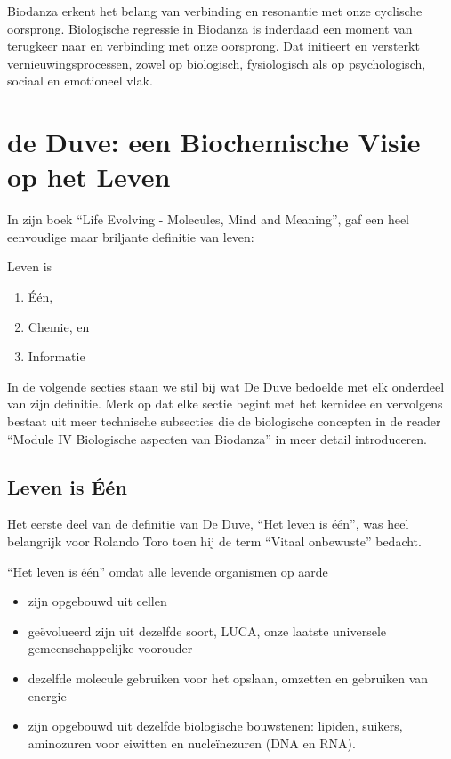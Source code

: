 \documentclass[
  11pt,
]{book}
\providecommand{\tightlist}{%
  \setlength{\itemsep}{0pt}\setlength{\parskip}{0pt}}
\begin{document}
Biodanza erkent het belang van verbinding en resonantie met onze cyclische oorsprong. Biologische regressie in Biodanza is inderdaad een moment van terugkeer naar en verbinding met onze oorsprong. Dat initieert en versterkt vernieuwingsprocessen, zowel op biologisch, fysiologisch als op psychologisch, sociaal en emotioneel vlak.

\newpage

\section{de Duve: een Biochemische Visie op het Leven}\label{de-duve-een-biochemische-visie-op-het-leven}

In zijn boek ``Life Evolving - Molecules, Mind and Meaning'', gaf \citet{deDuve2002} een heel eenvoudige maar briljante definitie van leven:

Leven is

\begin{enumerate}
\def\labelenumi{\arabic{enumi}.}
\tightlist
\item
  Één,
\item
  Chemie, en
\item
  Informatie
\end{enumerate}

In de volgende secties staan we stil bij wat De Duve bedoelde met elk onderdeel van zijn definitie. Merk op dat elke sectie begint met het kernidee en vervolgens bestaat uit meer technische subsecties die de biologische concepten in de reader ``Module IV Biologische aspecten van Biodanza'' in meer detail introduceren.

\subsection{Leven is Één}\label{lifeOne}

Het eerste deel van de definitie van De Duve, ``Het leven is één'', was heel belangrijk voor Rolando Toro toen hij de term ``Vitaal onbewuste'' bedacht.

``Het leven is één'' omdat alle levende organismen op aarde

\begin{itemize}
\tightlist
\item
  zijn opgebouwd uit cellen
\item
  geëvolueerd zijn uit dezelfde soort, LUCA, onze laatste universele gemeenschappelijke voorouder
\item
  dezelfde molecule gebruiken voor het opslaan, omzetten en gebruiken van energie
\item
  zijn opgebouwd uit dezelfde biologische bouwstenen: lipiden, suikers, aminozuren voor eiwitten en nucleïnezuren (DNA en RNA).
\end{itemize}
\end{document}
